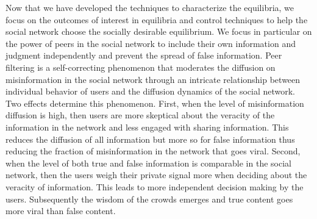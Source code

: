 Now that we have developed the techniques to characterize the equilibria, we focus on the outcomes of interest in equilibria and control techniques to help the social network choose the socially desirable equilibrium. We focus in particular on the power of peers in the social network to include their own information and judgment independently and prevent the spread of false information. Peer filtering is a self-correcting phenomenon that moderates the diffusion on misinformation in the social network through an intricate relationship between individual behavior of users and the diffusion dynamics of the social network.  Two effects determine this phenomenon. First, when the level of misinformation diffusion is high, then users are more skeptical about the veracity of the information in the network and less engaged with sharing information. This reduces the diffusion of all information but more so  for false information thus reducing the fraction of misinformation in the network that goes viral. Second, when the level of both true and false information is comparable in the social network, then the users weigh their private signal more when deciding about the veracity of information. This leads to more independent decision making by the users. Subsequently the wisdom of the crowds emerges and true content goes more viral than false content. 





